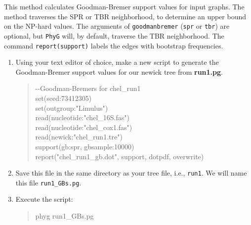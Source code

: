\documentclass[11pt]{article}
\newcommand{\phyg}{\texttt{PhyG} }
\begin{document}
This method calculates Goodman-Bremer support values for input graphs. The 
method traverses the SPR or TBR neighborhood, to determine an upper bound 
on the NP-hard values. The arguments of \texttt{goodmanbremer} (\texttt{spr} or 
\texttt{tbr}) are optional, but \phyg will, by default, traverse the TBR neighborhood. 
The command \texttt{report(support)} labels the edges with bootstrap frequencies.

\begin{enumerate}
 
 \item Using your text editor of choice, make a new script to generate the 
 Goodman-Bremer  support values for our newick tree from \textbf{run1.pg}.
 
         \begin{quote}
	-\/-Goodman-Bremers for chel\_run1\\
	set(seed:73412305) \\
	set(outgroup:"Limulus") \\
	read(nucleotide:"chel\_16S.fas") \\
	read(nucleotide:"chel\_cox1.fas") \\
	read(newick:"chel\_run1.tre") \\
	support(gb:spr, gbsample:10000)\\
	report("chel\_run1\_gb.dot", support, dotpdf, overwrite)
        \end{quote}  
       
\item Save this file in the same directory as your tree file, i.e., \texttt{run1}.
We will name this file \texttt{run1\_GBs.pg}.

\item Execute the script:

	\begin{quote}
  	phyg run1\_GBs.pg
	\end{quote}
	

\end{enumerate}
\end{document}
